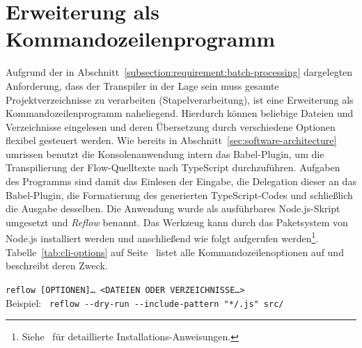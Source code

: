 \section{Erweiterung als Kommandozeilenprogramm}
\label{sec:cli-program}

Aufgrund der in Abschnitt~\ref{subsection:requirement:batch-processing} dargelegten Anforderung, dass der Transpiler in der Lage sein muss gesamte Projektverzeichnisse zu verarbeiten (Stapelverarbeitung), ist eine Erweiterung als Kommandozeilenprogramm naheliegend. Hierdurch können beliebige Dateien und Verzeichnisse eingelesen und deren Übersetzung durch verschiedene Optionen flexibel gesteuert werden. Wie bereits in Abschnitt~\ref{sec:software-architecture} umrissen benutzt die Konsolenanwendung intern das Babel-Plugin, um die Transpilierung der Flow-Quelltexte nach TypeScript durchzuführen. Aufgaben des Programms sind damit das Einlesen der Eingabe, die Delegation dieser an das Babel-Plugin, die Formatierung des generierten TypeScript-Codes und schließlich die Ausgabe desselben.
Die Anwendung wurde als ausführbares Node.js-Skript umgesetzt und \textit{Reflow} benannt. Das Werkzeug kann durch das Paketsystem von Node.js installiert werden und anschließend wie folgt aufgerufen werden\footnote{Siehe~\autocite{REFLOW_GITHUB} für detaillierte Installations-Anweisungen.}. Tabelle~\ref{tab:cli-options} auf Seite~\pageref{tab:cli-options} listet alle Kommandozeilenoptionen auf und beschreibt deren Zweck.

{
  \small
  \texttt{reflow [OPTIONEN]… <DATEIEN ODER VERZEICHNISSE…>}\\
  Beispiel: \texttt{ reflow -{}-dry-run -{}-include-pattern "{}*/.js"{} src/}
}

